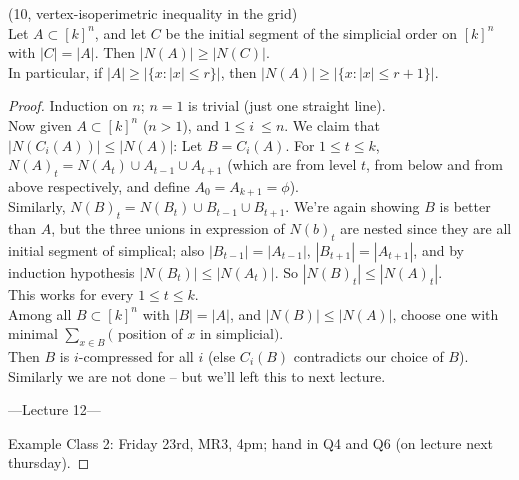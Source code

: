 \documentclass[a4paper]{article}
\begin{document}
\begin{thm} (10, vertex-isoperimetric inequality in the grid)\\
    Let $A \subset [k]^n$, and let $C$ be the initial segment of the simplicial order on $[k]^n$ with $|C|=|A|$. Then $|N(A)| \geq |N(C)|$.\\
    In particular, if $|A| \geq |\{x:|x| \leq r\}|$, then $|N(A)| \geq |\{x:|x| \leq r+1\}|$.
    \begin{proof}
        Induction on $n$; $n=1$ is trivial (just one straight line).\\
        Now given $A \subset [k]^n$ ($n>1$), and $1 \leq i\ \leq n$. We claim that $|N(C_i(A))| \leq |N(A)|$: Let $B = C_i(A)$. For $1 \leq t \leq k$, $N(A)_t = N(A_t) \cup A_{t-1} \cup A_{t+1}$ (which are from level $t$, from below and from above respectively, and define $A_0 = A_{k+1} = \phi$).\\
        Similarly, $N(B)_t = N(B_t) \cup B_{t-1} \cup B_{t+1}$. We're again showing $B$ is better than $A$, but the three unions in expression of $N(b)_t$ are nested since they are all initial segment of simplical; also $|B_{t-1}| = |A_{t-1}|$, $|B_{t+1}| = |A_{t+1}|$, and by induction hypothesis $|N(B_t)| \leq |N(A_t)|$. So $|N(B)_t| \leq |N(A)_t|$.\\
        This works for every $1 \leq t \leq k$.\\
        Among all $B \subset [k]^n$ with $|B| = |A|$, and $|N(B)| \leq |N(A)|$, choose one with minimal $\sum_{x \in B} ($ position of $x$ in simplicial$)$.\\
        Then $B$ is $i$-compressed for all $i$ (else $C_i(B)$ contradicts our choice of $B$).\\
        Similarly we are not done -- but we'll left this to next lecture.

        ---Lecture 12---
        
        Example Class 2: Friday 23rd, MR3, 4pm; hand in Q4 and Q6 (on lecture next thursday).


\end{proof}
\end{thm}
\end{document}
